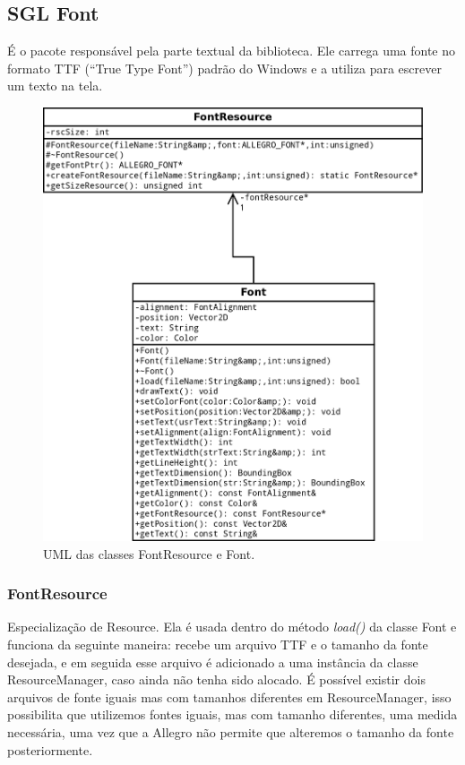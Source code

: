 \subsection{SGL Font}
%
%
É o pacote responsável pela parte textual da biblioteca. Ele carrega uma fonte no formato TTF (``True Type Font'') padrão do Windows e a utiliza para escrever um texto na tela.
%
%
%
\begin{figure}[H]
    \centering
		\caption{UML das classes FontResource e Font.}
    \label{Font}
    \includegraphics[scale = 0.20]{uml/Font.png}
\end{figure}
%
%
\subsubsection{FontResource}
%
%
Especialização de Resource. Ela é usada dentro do método \textit{load()} da classe Font e funciona da seguinte maneira: recebe um arquivo TTF e o tamanho da fonte desejada, e em seguida esse arquivo é adicionado a uma instância da classe ResourceManager, caso ainda não tenha sido alocado. É possível existir dois arquivos de fonte iguais mas com tamanhos diferentes em ResourceManager, isso possibilita que utilizemos fontes iguais, mas com tamanho diferentes, uma medida necessária, uma vez que a Allegro não permite que alteremos o tamanho da fonte posteriormente.
%
%
